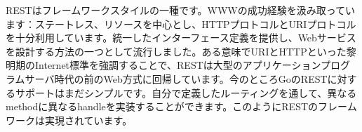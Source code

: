 RESTはフレームワークスタイルの一種です。WWWの成功経験を汲み取っています：ステートレス、リソースを中心とし、HTTPプロトコルとURIプロトコルを十分利用しています。統一したインターフェース定義を提供し、Webサービスを設計する方法の一つとして流行しました。ある意味でURIとHTTPといった黎明期のInternet標準を強調することで、RESTは大型のアプリケーションプログラムサーバ時代の前のWeb方式に回帰しています。今のところGoのRESTに対するサポートはまだシンプルです。自分で定義したルーティングを通して、異なるmethodに異なるhandleを実装することができます。このようにRESTのフレームワークは実現されています。
